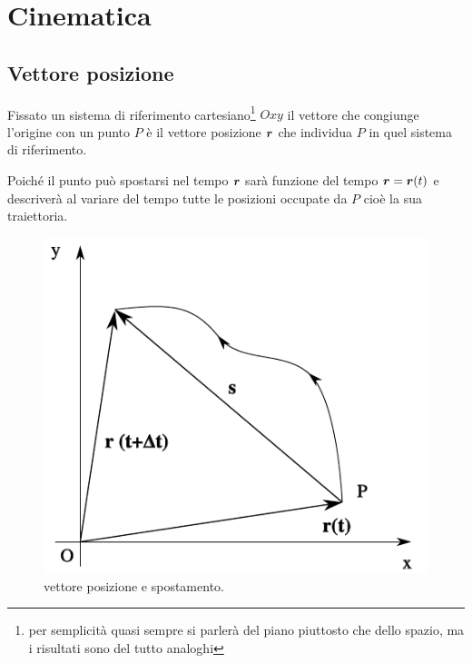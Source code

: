 
\chapter{Cinematica}
\minitoc
\section{Vettore posizione}
\begin{Def}
  Fissato un sistema di riferimento cartesiano\footnote{per semplicità quasi sempre si parlerà del piano piuttosto che dello spazio, ma i risultati sono del tutto analoghi} $Oxy$ il vettore che congiunge l'origine con un punto $P$ è il vettore posizione $\boldsymbol{r}$ che individua $P$ in quel sistema di riferimento.
\end{Def}
Poiché il punto può spostarsi nel tempo $\boldsymbol{r}$ sarà funzione del tempo $\boldsymbol{r}=\boldsymbol{r}(t)$ e descriverà al variare del tempo tutte le posizioni occupate da $P$ cioè la sua traiettoria.

\begin{figure}[htbp]
  \centering
  \includegraphics[scale=0.7]{immagini/fisica1/vettore_posizione}
  \caption{vettore posizione e spostamento.}
\end{figure}
